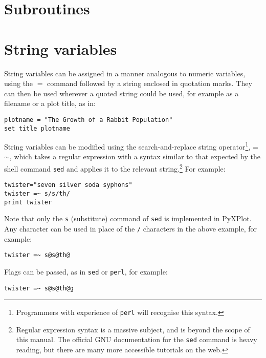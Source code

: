\section{Subroutines}

\section{String variables}
\label{sect:stringvars}

String variables can be assigned in a manner analogous to numeric variables,
using the $=$ command followed by a string enclosed in quotation marks. They can
then be used wherever a quoted string could be used, for example as a filename
or a plot title, as in:

\begin{verbatim}
plotname = "The Growth of a Rabbit Population"
set title plotname
\end{verbatim}

String variables can be modified using the search-and-replace string
operator\footnote{Programmers with
experience of {\tt perl} will recognise this syntax.}, =$\sim$, which takes a regular expression with a syntax similar to that
expected by the shell command {\tt sed} and applies it to the relevant string.\footnote{Regular expression
syntax is a massive subject, and is beyond the scope of this manual. The
official GNU documentation for the {\tt sed} command is heavy reading, but
there are many more accessible tutorials on the web.} For example:

\begin{verbatim}
twister="seven silver soda syphons"
twister =~ s/s/th/
print twister
\end{verbatim}

Note that only the {\tt s} (substitute) command of {\tt sed} is implemented in
PyXPlot. Any character can be used in place of the {\tt /} characters in the
above example, for example:

\begin{verbatim}
twister =~ s@s@th@
\end{verbatim}

\noindent Flags can be passed, as in {\tt sed} or {\tt perl}, for example:

\begin{verbatim}
twister =~ s@s@th@g
\end{verbatim}

